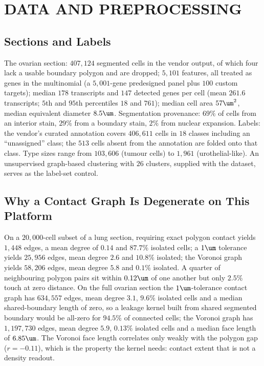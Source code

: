 \section{DATA AND PREPROCESSING}
\label{app:data}


\subsection{Sections and Labels}
\label{app:sections}

The ovarian section: $407{,}124$ segmented cells in the vendor output, of which four lack a usable boundary polygon and are dropped; $5{,}101$ features, all treated as genes in the multinomial (a $5{,}001$-gene predesigned panel plus $100$ custom targets); median $178$ transcripts and $147$ detected genes per cell (mean $261.6$ transcripts; $5$th and $95$th percentiles $18$ and $761$); median cell area $57\um^2$, median equivalent diameter $8.5\um$. Segmentation provenance: $69\%$ of cells from an interior stain, $29\%$ from a boundary stain, $2\%$ from nuclear expansion. Labels: the vendor's curated annotation covers $406{,}611$ cells in $18$ classes including an ``unassigned'' class; the $513$ cells absent from the annotation are folded onto that class. Type sizes range from $103{,}606$ (tumour cells) to $1{,}961$ (urothelial-like). An unsupervised graph-based clustering with $26$ clusters, supplied with the dataset, serves as the label-set control.


\subsection{Why a Contact Graph Is Degenerate on This Platform}
\label{app:contact}

On a $20{,}000$-cell subset of a lung section, requiring exact polygon contact yields $1{,}448$ edges, a mean degree of $0.14$ and $87.7\%$ isolated cells; a $1\um$ tolerance yields $25{,}956$ edges, mean degree $2.6$ and $10.8\%$ isolated; the Voronoi graph yields $58{,}206$ edges, mean degree $5.8$ and $0.1\%$ isolated. A quarter of neighbouring polygon pairs sit within $0.12\um$ of one another but only $2.5\%$ touch at zero distance. On the full ovarian section the $1\um$-tolerance contact graph has $634{,}557$ edges, mean degree $3.1$, $9.6\%$ isolated cells and a median shared-boundary length of zero, so a leakage kernel built from shared segmented boundary would be all-zero for $94.5\%$ of connected cells; the Voronoi graph has $1{,}197{,}730$ edges, mean degree $5.9$, $0.13\%$ isolated cells and a median face length of $6.85\um$. The Voronoi face length correlates only weakly with the polygon gap ($r = -0.11$), which is the property the kernel needs: contact extent that is not a density readout.

